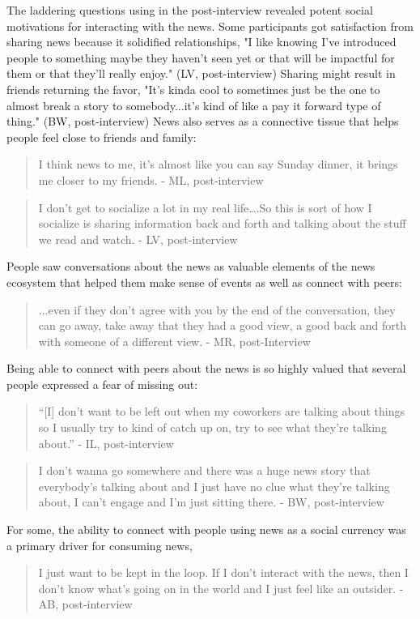 \documentclass[sigchi]{acmart}
\begin{document}
The laddering questions using in the post-interview revealed potent social motivations for interacting with the news. Some participants got satisfaction from sharing news because it solidified relationships, "I like knowing I've introduced people to something maybe they haven't seen yet or that will be impactful for them or that they'll really enjoy." (LV, post-interview) Sharing might result in friends returning the favor, "It's kinda cool to sometimes just be the one to almost break a story to somebody...it’s kind of like a pay it forward type of thing." (BW, post-interview) News also serves as a connective tissue that helps people feel close to friends and family:
\begin{quote}
I think news to me, it's almost like you can say Sunday dinner, it brings me closer to my friends. - ML, post-interview
\end{quote}
\begin{quote}
I don't get to socialize a lot in my real life….So this is sort of how I socialize is sharing information back and forth and talking about the stuff we read and watch.  - LV, post-interview
\end{quote}
People saw conversations about the news as valuable elements of the news ecosystem that helped them make sense of events as well as connect with peers:
\begin{quote}
...even if they don't agree with you by the end of the conversation, they can go away, take away that they had a good view, a good back and forth with someone of a different view. - MR, post-Interview
\end{quote}
Being able to connect with peers about the news is so highly valued that several people expressed a fear of missing out:
\begin{quote}
“[I] don't want to be left out when my coworkers are talking about things so I usually try to kind of catch up on, try to see what they're talking about.” - IL, post-interview
\end{quote}
\begin{quote}
I don’t wanna go somewhere and there was a huge news story that everybody's talking about and I just have no clue what they're talking about, I can't engage and I'm just sitting there. - BW, post-interview
\end{quote}
For some, the ability to connect with people using news as a social currency was a primary driver for consuming news,
\begin{quote}
I just want to be kept in the loop. If I don't interact with the news, then I don't know what's going on in the world and I just feel like an outsider. - AB, post-interview
\end{quote}
\end{document}
